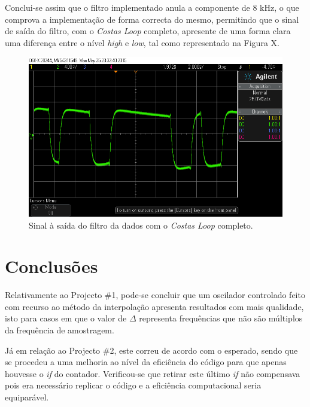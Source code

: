 \documentclass[11pt]{article}
\numberwithin{equation}{section}
\begin{document}
Conclui-se assim que o filtro implementado anula a componente de 8 kHz, o que comprova a implementação de forma correcta do mesmo, permitindo que o sinal de saída do filtro, com o \textit{Costas Loop} completo, apresente de uma forma clara uma diferença entre o nível \textit{high} e \textit{low}, tal como representado na Figura X.

\begin{figure}[H]
	\centering
	\includegraphics[keepaspectratio=true, scale=0.37]{exps/pulse_saida_filtro_Sine_mudancanoFiltro}
	\caption{Sinal à saída do filtro da dados com o \textit{Costas Loop} completo.}
	\vspace{-0.8em}
\end{figure}

\section{Conclusões}

Relativamente ao Projecto \#1, pode-se concluir que um oscilador controlado feito com recurso ao método da interpolação apresenta resultados com mais qualidade, isto para casos em que o valor de $\Delta$ representa frequências que não são múltiplos da frequência de amostragem. 

Já em relação ao Projecto \#2, este correu de acordo com o esperado, sendo que se procedeu a uma melhoria ao nível da eficiência do código para que apenas houvesse o \textit{if} do contador. Verificou-se que retirar este último \textit{if} não compensava pois era necessário replicar o código e a eficiência computacional seria equiparável. 


\pagebreak
\end{document}
